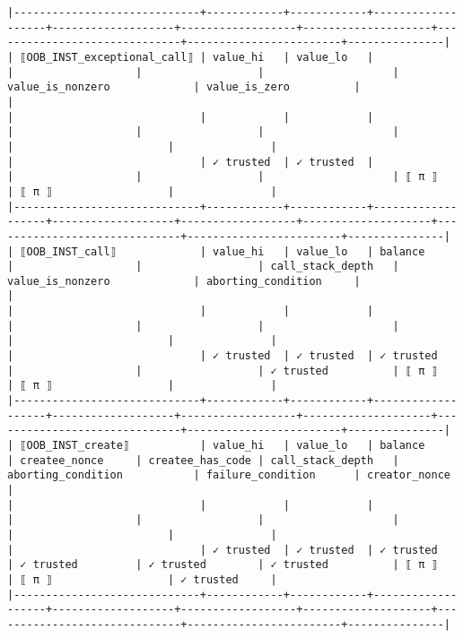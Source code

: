 \documentclass[varwidth=\maxdimen,margin=0.5cm,multi={verbatim}]{standalone}
\begin{document}
\begin{verbatim}
|-----------------------------+------------+------------+-------------------+-------------------+------------------+--------------------+------------------------------+------------------------+---------------|
| ⟦OOB_INST_exceptional_call⟧ | value_hi   | value_lo   |                   |                   |                  |                    | value_is_nonzero             | value_is_zero          |               |
|                             |            |            |                   |                   |                  |                    |                              |                        |               |
|                             | ✓ trusted  | ✓ trusted  |                   |                   |                  |                    | ⟦ π ⟧                        | ⟦ π ⟧                  |               |
|-----------------------------+------------+------------+-------------------+-------------------+------------------+--------------------+------------------------------+------------------------+---------------|
| ⟦OOB_INST_call⟧             | value_hi   | value_lo   | balance           |                   |                  | call_stack_depth   | value_is_nonzero             | aborting_condition     |               |
|                             |            |            |                   |                   |                  |                    |                              |                        |               |
|                             | ✓ trusted  | ✓ trusted  | ✓ trusted         |                   |                  | ✓ trusted          | ⟦ π ⟧                        | ⟦ π ⟧                  |               |
|-----------------------------+------------+------------+-------------------+-------------------+------------------+--------------------+------------------------------+------------------------+---------------|
| ⟦OOB_INST_create⟧           | value_hi   | value_lo   | balance           | createe_nonce     | createe_has_code | call_stack_depth   | aborting_condition           | failure_condition      | creator_nonce |
|                             |            |            |                   |                   |                  |                    |                              |                        |               |
|                             | ✓ trusted  | ✓ trusted  | ✓ trusted         | ✓ trusted         | ✓ trusted        | ✓ trusted          | ⟦ π ⟧                        | ⟦ π ⟧                  | ✓ trusted     |
|-----------------------------+------------+------------+-------------------+-------------------+------------------+--------------------+------------------------------+------------------------+---------------|

\end{verbatim}
\end{document}
